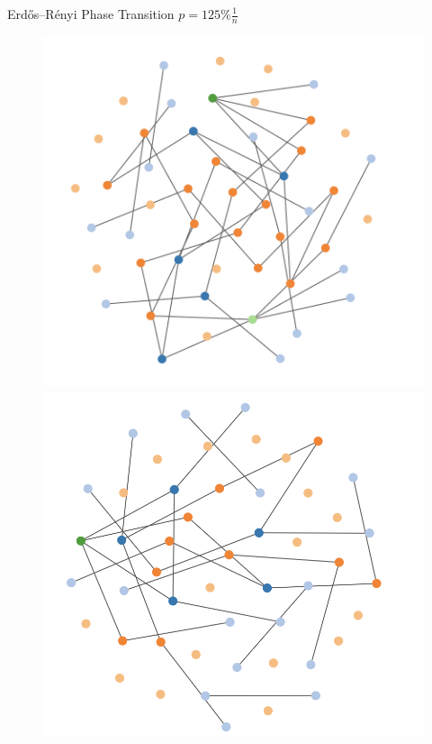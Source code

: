 \documentclass[aspectratio=169, handout]{beamer}
\begin{document}
\begin{frame}{Erdős–Rényi Phase Transition $p = 125\% \frac{1}{n}$}
\begin{figure}
\centering
\includegraphics[scale=0.22]{images/percolation-3-1.png}
\includegraphics[scale=0.22]{images/percolation-3-2.png}

\end{figure}
\end{frame}
\end{document}
